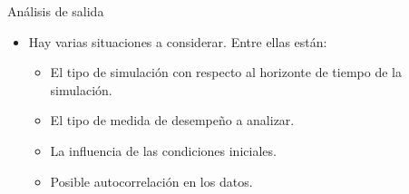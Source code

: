 \begin{frame}{Análisis de salida}
    \begin{itemize}
        \item Hay varias situaciones a considerar. Entre ellas están:
        \begin{itemize}
            \item El tipo de simulación con respecto al horizonte de tiempo de la simulación.
            \item El tipo de medida de desempeño a analizar.
            \item La influencia de las condiciones iniciales.
            \item Posible autocorrelación en los datos.
        \end{itemize}
    \end{itemize}
\end{frame}